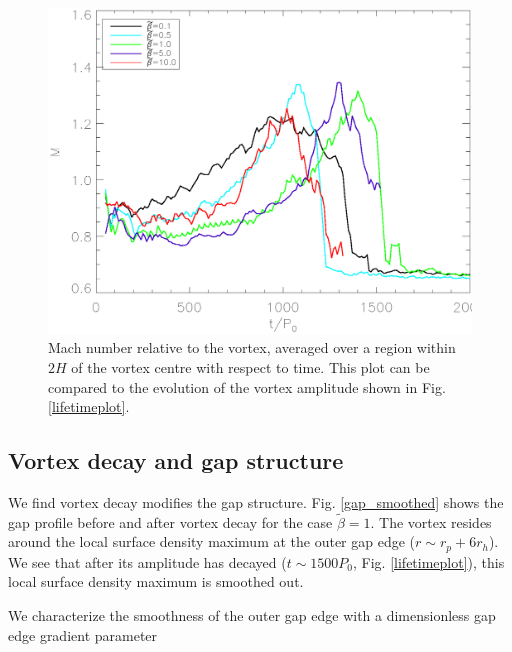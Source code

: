 \begin{figure}
  \includegraphics[width=\linewidth]{figures/mach}
  \caption{Mach number relative to
    the vortex, averaged over a region within $2H$ of the  
    vortex centre with respect to time. This plot can be compared to the evolution of the
    vortex amplitude shown in Fig. \ref{lifetimeplot}.
    \label{machplot}}
\end{figure}

\subsection{Vortex decay and gap structure}  
We find vortex decay modifies the gap
structure. Fig. \ref{gap_smoothed} shows the gap profile before and
after vortex decay for the case $\tilde{\beta}=1$. The vortex resides
around the local surface density maximum at the outer gap edge ($r\sim r_p +
6r_h$). We see that after its amplitude has decayed ($t\sim1500P_0$,   
Fig. \ref{lifetimeplot}), this local surface density maximum is 
smoothed out.
   
We characterize the smoothness of the outer gap edge with a dimensionless
gap edge gradient parameter

